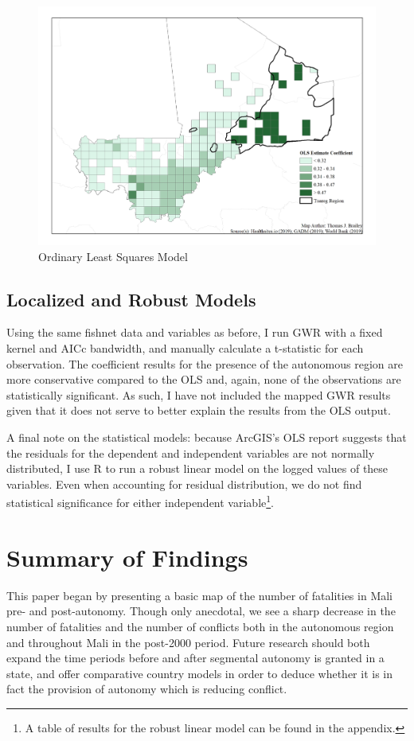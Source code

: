 \documentclass[12pt]{elsarticle}
\begin{document}
\begin{figure}[ht]
\centering\includegraphics[width=\textwidth,height=\textheight,keepaspectratio]{tjbrailey_final_project_map_health_ols.jpg}
\caption{Ordinary Least Squares Model}
\end{figure}

\subsection{Localized and Robust Models}
Using the same fishnet data and variables as before, I run GWR with a fixed kernel and AICc bandwidth, and manually calculate a t-statistic for each observation. The coefficient results for the presence of the autonomous region are more conservative compared to the OLS and, again, none of the observations are statistically significant.  As such, I have not included the mapped GWR results given that it does not serve to better explain the results from the OLS output. 

A final note on the statistical models: because ArcGIS's OLS report suggests that the residuals for the dependent and independent variables are not normally distributed, I use R to run a robust linear model on the logged values of these variables. Even when accounting for residual distribution, we do not find statistical significance for either independent variable\footnote{A table of results for the robust linear model can be found in the appendix.}.  

\section{Summary of Findings}
This paper began by presenting a basic map of the number of fatalities in Mali pre- and post-autonomy. Though only anecdotal, we see a sharp decrease in the number of fatalities and the number of conflicts both in the autonomous region and throughout Mali in the post-2000 period. Future research should both expand the time periods before and after segmental autonomy is granted in a state, and offer comparative country models in order to deduce whether it is in fact the provision of autonomy which is reducing conflict. 
\end{document}
